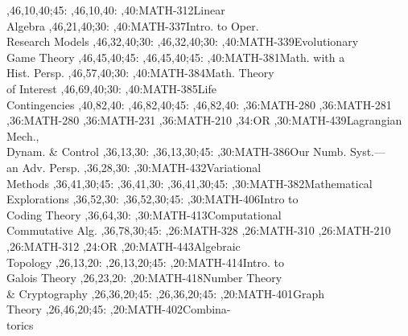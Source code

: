\documentclass[9pt]{extarticle}
\begin{document}
\begin{chart}
  ,46,10,40;45:
  ,46,10,40:
,40:{MATH-312}{Linear\\Algebra}{}
  ,46,21,40;30:
,40:{MATH-337}{Intro. to Oper.\\Research Models}{}
  ,46,32,40;30:
  ,46,32,40;30:
,40:{MATH-339}{Evolutionary\\Game Theory}{}
  ,46,45,40;45:
  ,46,45,40;45:
,40:{MATH-381}{Math. with a\\Hist. Persp.}{}
  ,46,57,40;30:
,40:{MATH-384}{Math. Theory\\of Interest}{}
  ,46,69,40;30:
,40:{MATH-385}{Life\\Contingencies}{}
  ,40,82,40:
  ,46,82,40;45:
  ,46,82,40:
,36:{MATH-280}
,36:{MATH-281}
,36:{MATH-280}
,36:{MATH-231}
,36:{MATH-210}
,34:{OR}
,30:{MATH-439}{Lagrangian Mech.,\\Dynam. \& Control}{}
  ,36,13,30:
  ,36,13,30;45:
,30:{MATH-386}{Our Numb. Syst.---\\an Adv. Persp.}{}
  ,36,28,30:
,30:{MATH-432}{Variational\\Methods}{}
  ,36,41,30;45:
  ,36,41,30:
  ,36,41,30;45:
,30:{MATH-382}{Mathematical\\Explorations}{}
  ,36,52,30:
  ,36,52,30;45:
,30:{MATH-406}{Intro to\\Coding Theory}{}
  ,36,64,30:
,30:{MATH-413}{Computational\\Commutative Alg.}{}
  ,36,78,30;45:
,26:{MATH-328}
,26:{MATH-310}
,26:{MATH-210}
,26:{MATH-312}
,24:{OR}
,20:{MATH-443}{Algebraic\\Topology}{}
  ,26,13,20:
  ,26,13,20;45:
,20:{MATH-414}{Intro. to\\Galois Theory}{}
  ,26,23,20:
,20:{MATH-418}{Number Theory\\\& Cryptography}{}
  ,26,36,20;45:
  ,26,36,20;45:
,20:{MATH-401}{Graph\\Theory}{}
  ,26,46,20;45:
,20:{MATH-402}{Combina-\\torics}{}

\end{chart}
\end{document}
